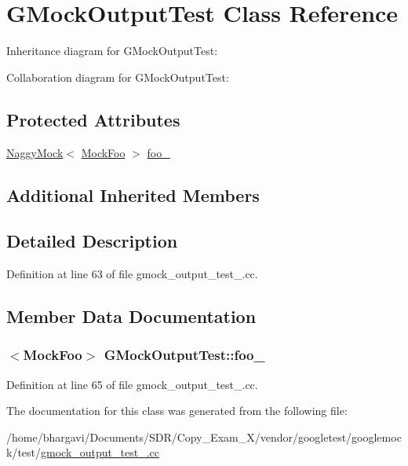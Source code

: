 \hypertarget{class_g_mock_output_test}{}\section{G\+Mock\+Output\+Test Class Reference}
\label{class_g_mock_output_test}


Inheritance diagram for G\+Mock\+Output\+Test\+:


Collaboration diagram for G\+Mock\+Output\+Test\+:
\subsection*{Protected Attributes}
\begin{DoxyCompactItemize}
\item 
\hyperlink{classtesting_1_1_naggy_mock}{Naggy\+Mock}$<$ \hyperlink{class_mock_foo}{Mock\+Foo} $>$ \hyperlink{class_g_mock_output_test_aed97d2ca515d69466968c60575cc18a2}{foo\+\_\+}
\end{DoxyCompactItemize}
\subsection*{Additional Inherited Members}


\subsection{Detailed Description}


Definition at line 63 of file gmock\+\_\+output\+\_\+test\+\_\+.\+cc.



\subsection{Member Data Documentation}
\subsubsection[{\texorpdfstring{foo\+\_\+}{foo_}}]{$<${\bf Mock\+Foo}$>$ G\+Mock\+Output\+Test\+::foo\+\_\+\hspace{0.3cm}{\ttfamily [protected]}}\hypertarget{class_g_mock_output_test_aed97d2ca515d69466968c60575cc18a2}{}\label{class_g_mock_output_test_aed97d2ca515d69466968c60575cc18a2}


Definition at line 65 of file gmock\+\_\+output\+\_\+test\+\_\+.\+cc.



The documentation for this class was generated from the following file\+:\begin{DoxyCompactItemize}
\item 
/home/bhargavi/\+Documents/\+S\+D\+R/\+Copy\+\_\+\+Exam\+\_\+X/vendor/googletest/googlemock/test/\hyperlink{gmock__output__test___8cc}{gmock\+\_\+output\+\_\+test\+\_\+.\+cc}\end{DoxyCompactItemize}
